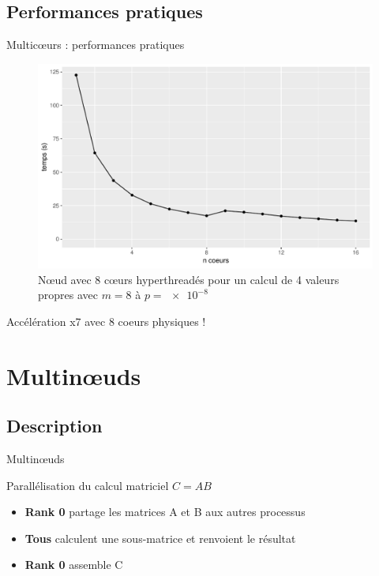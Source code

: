 \documentclass[9.5pt]{beamer}
\begin{document}
	\subsection{Performances pratiques}
		\begin{frame}{Multic\oe{}urs : performances pratiques}
			\begin{figure}
				\includegraphics[width=0.6\linewidth]{../rapport/plots/omp_perf.pdf}
				\caption{Nœud avec 8 cœurs hyperthreadés pour un calcul de 4 valeurs propres avec $m = 8$ à $p=\SI{e-8}{}$ \label{fig:omp_perf}}
			\end{figure}
			\centering
			Accélération x7 avec 8 coeurs physiques !
		\end{frame}

\section{Multin\oe{}uds}
	\subsection{Description}
		\begin{frame}{Multin\oe{}uds}
			\begin{block}{Parallélisation du calcul matriciel $C = AB$}
				\begin{itemize}
					\item \textbf{Rank 0} partage les matrices A et B aux autres processus
					\item \textbf{Tous} calculent une sous-matrice et renvoient le résultat
					\item \textbf{Rank 0} assemble C
				\end{itemize}
			\end{block}
		\end{frame}
\end{document}
